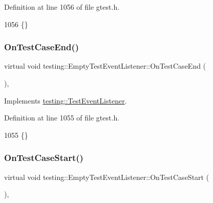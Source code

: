 Definition at line 1056 of file gtest.\+h.


\begin{DoxyCode}
1056 \{\}
\end{DoxyCode}
\mbox{\label{classtesting_1_1EmptyTestEventListener_a6bec703158283104c4298f7d8a528515}} 
\subsubsection{\texorpdfstring{On\+Test\+Case\+End()}{OnTestCaseEnd()}}
{\footnotesize\ttfamily virtual void testing\+::\+Empty\+Test\+Event\+Listener\+::\+On\+Test\+Case\+End (\begin{DoxyParamCaption}\item[{const \hyperlink{classtesting_1_1TestCase}{Test\+Case} \&}]{ }\end{DoxyParamCaption})\hspace{0.3cm}{\ttfamily [inline]}, {\ttfamily [virtual]}}



Implements \hyperlink{classtesting_1_1TestEventListener_ae61985e2ef76ac78379b077be57a9c36}{testing\+::\+Test\+Event\+Listener}.



Definition at line 1055 of file gtest.\+h.


\begin{DoxyCode}
1055 \{\}
\end{DoxyCode}
\mbox{\label{classtesting_1_1EmptyTestEventListener_ae4707ed9cc7ace5241bc8ccc4051209b}} 
\subsubsection{\texorpdfstring{On\+Test\+Case\+Start()}{OnTestCaseStart()}}
{\footnotesize\ttfamily virtual void testing\+::\+Empty\+Test\+Event\+Listener\+::\+On\+Test\+Case\+Start (\begin{DoxyParamCaption}\item[{const \hyperlink{classtesting_1_1TestCase}{Test\+Case} \&}]{ }\end{DoxyParamCaption})\hspace{0.3cm}{\ttfamily [inline]}, {\ttfamily [virtual]}}



